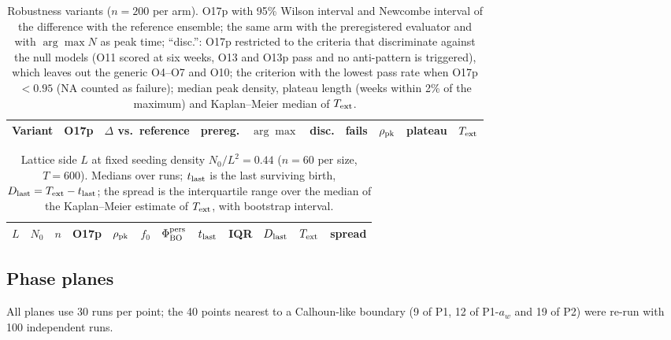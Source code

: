 \begin{table}[ht]
  \centering
  \caption{Robustness variants ($n=200$ per arm). O17p with 95\% Wilson interval and Newcombe interval of the
  difference with the reference ensemble; the same arm with the preregistered evaluator and with $\arg\max N$ as peak
  time; ``disc.'': O17p restricted to the criteria that discriminate against the null models (O11 scored at six
  weeks, O13 and O13p pass and no anti-pattern is triggered), which leaves out the generic O4--O7 and O10; the criterion with the lowest
  pass rate when O17p $<0.95$ (NA counted as failure); median peak density, plateau length (weeks within 2\% of the
  maximum) and Kaplan--Meier median of $T_{\rm ext}$.}
  \label{tab:res-rob}
  \scriptsize
  \setlength{\tabcolsep}{3.2pt}
  \begin{tabular}{@{}lllccclccc@{}}
    \toprule
    Variant & O17p & $\Delta$ vs.\ reference & prereg. & $\arg\max$ & disc. & fails & $\rho_{\rm pk}$ & plateau & $T_{\rm ext}$ \\
    \midrule
    
  \end{tabular}
\end{table}

\begin{table}[ht]
  \centering
  \caption{Lattice side $L$ at fixed seeding density $N_0/L^2=0.44$ ($n=60$ per size, $T=600$). Medians over runs;
  $t_{\rm last}$ is the last surviving birth, $D_{\rm last}=T_{\rm ext}-t_{\rm last}$; the spread is the
  interquartile range over the median of the Kaplan--Meier estimate of $T_{\rm ext}$, with bootstrap interval.}
  \label{tab:res-size}
  \scriptsize
  \setlength{\tabcolsep}{3.5pt}
  \begin{tabular}{@{}rrrlcccrrrrl@{}}
    \toprule
    $L$ & $N_0$ & $n$ & O17p & $\rho_{\rm pk}$ & $f_0$ & $\Phi^{\rm pers}_{\rm BO}$ & $t_{\rm last}$ & IQR & $D_{\rm last}$ & $T_{\rm ext}$ & spread \\
    \midrule
    
  \end{tabular}
\end{table}

\subsection{Phase planes}
\label{sec:res-planes}

All planes use 30 runs per point; the 40 points nearest to a Calhoun-like boundary (9 of P1, 12 of P1-$a_w$ and 19
of P2) were re-run with 100 independent runs.

